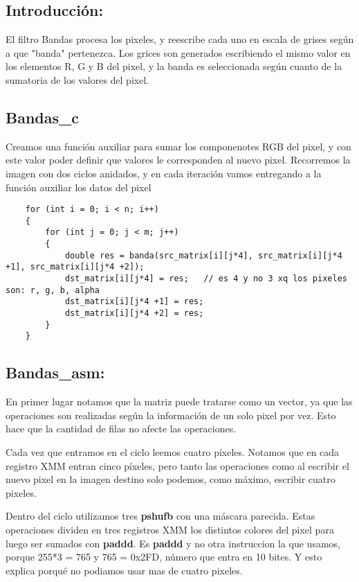 

\subsection{Introducci\'on:}

El filtro Bandas procesa los pixeles, y reescribe cada uno en escala de grises seg\'un a que "banda" pertenezca. Los grices son generados escribiendo el mismo valor en los elementos R, G y B del pixel, y la banda es seleccionada seg\'un cuanto de la sumatoria de los valores del pixel.

\subsection{Bandas_c}

Creamos una funci\'on auxiliar para sumar los componenotes RGB del pixel, y con este valor poder definir que valores le corresponden al nuevo pixel.
Recorremos la imagen con dos ciclos anidados, y en cada iteraci\'on vamos entregando a la funci\'on auxiliar los datos del pixel

\begin{codesnippet}
\begin{verbatim}
	for (int i = 0; i < n; i++)
	{
		for (int j = 0; j < m; j++)
		{
			double res = banda(src_matrix[i][j*4], src_matrix[i][j*4 +1], src_matrix[i][j*4 +2]);
			dst_matrix[i][j*4] = res;	// es 4 y no 3 xq los pixeles son: r, g, b, alpha
			dst_matrix[i][j*4 +1] = res;
			dst_matrix[i][j*4 +2] = res;
		}
	}
\end{verbatim}
\end{codesnippet}

\subsection{Bandas_asm:}

En primer lugar notamos que la matriz puede tratarse como un vector, ya que las operaciones son realizadas seg\'un la informaci\'on de un solo pixel por vez.
Esto hace que la cantidad de filas no afecte las operaciones.

Cada vez que entramos en el ciclo leemos cuatro p\'ixeles. 
Notamos que en cada registro XMM entran cinco p\'ixeles, pero tanto las operaciones como al escribir el nuevo pixel en la imagen destino solo podemos, como m\'aximo, escribir 
cuatro pixeles.

Dentro del ciclo utilizamos tres \textbf{pshufb} con una m\'ascara parecida. 
Estas operaciones dividen en tres registros XMM los distintos colores del pixel para luego ser sumados con \textbf{paddd}. Es \textbf{paddd} y no otra instruccion la que usamos, porque 255*3 = 765 y 765 = 0x2FD, n\'umero que entra en 10 bites. Y esto explica porqu\'e no podiamos usar mas de cuatro pixeles.


